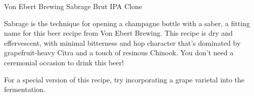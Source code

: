 \begin{recipie}{Von Ebert Brewing Sabrage Brut IPA Clone}

\begin{aboutblock}
Sabrage is the technique for opening a champagne bottle with a saber, a fitting name
for this beer recipe from Von Ebert Brewing. This recipe is dry and effervescent,
with minimal bitterness and hop character that's dominated by grapefruit-heavy Citra
and a touch of resinous Chinook. You don't need a ceremonial occasion to drink
this beer! \sourceaha
\end{aboutblock}


\begin{methodandtiming}
 
\begin{mashsteps}
\end{mashsteps}

\begin{fermentationsteps}
\end{fermentationsteps}

\begin{directions}
For a special version of this recipe, try incorporating a grape varietal into the
fermentation.
\end{directions}

\end{methodandtiming}

\pagebreak

\begin{ingredientsblock}

\begin{malts}
\end{malts}

\begin{hops}
\end{hops}


\end{ingredientsblock}

\end{recipie}

